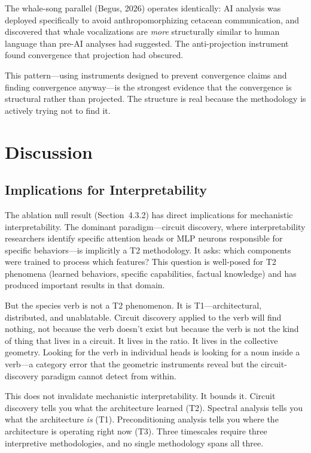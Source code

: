 \documentclass[12pt]{article}
\begin{document}
The whale-song parallel (Begus, 2026) operates identically: AI analysis was deployed specifically to avoid anthropomorphizing cetacean communication, and discovered that whale vocalizations are \emph{more} structurally similar to human language than pre-AI analyses had suggested. The anti-projection instrument found convergence that projection had obscured.

This pattern---using instruments designed to prevent convergence claims and finding convergence anyway---is the strongest evidence that the convergence is structural rather than projected. The structure is real because the methodology is actively trying not to find it.

\section{Discussion}

\subsection{Implications for Interpretability}

The ablation null result (Section~4.3.2) has direct implications for mechanistic interpretability. The dominant paradigm---circuit discovery, where interpretability researchers identify specific attention heads or MLP neurons responsible for specific behaviors---is implicitly a T2 methodology. It asks: which components were trained to process which features? This question is well-posed for T2 phenomena (learned behaviors, specific capabilities, factual knowledge) and has produced important results in that domain.

But the species verb is not a T2 phenomenon. It is T1---architectural, distributed, and unablatable. Circuit discovery applied to the verb will find nothing, not because the verb doesn't exist but because the verb is not the kind of thing that lives in a circuit. It lives in the ratio. It lives in the collective geometry. Looking for the verb in individual heads is looking for a noun inside a verb---a category error that the geometric instruments reveal but the circuit-discovery paradigm cannot detect from within.

This does not invalidate mechanistic interpretability. It bounds it. Circuit discovery tells you what the architecture learned (T2). Spectral analysis tells you what the architecture \emph{is} (T1). Preconditioning analysis tells you where the architecture is operating right now (T3). Three timescales require three interpretive methodologies, and no single methodology spans all three.
\end{document}
